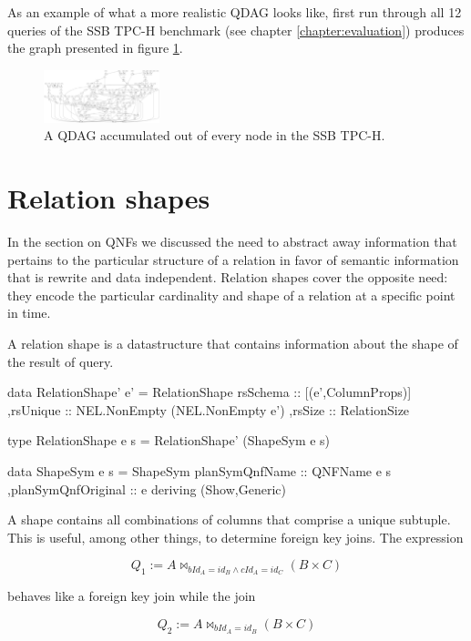 As an example of what a more realistic QDAG looks like, first run
through all 12 queries of the SSB TPC-H benchmark (see chapter
\ref{chapter:evaluation}) produces the graph presented in figure
\ref{fig:ssb_graph}.

\begin{figure}[H]
  \centering
  \includegraphics[width=0.3\textwidth]{./imgs/ssb_graph.pdf}
  \caption{\label{fig:ssb_graph}A QDAG accumulated out of every node
    in the SSB TPC-H.}
\end{figure}



\section{Relation shapes}

In the section on QNFs we discussed the need to abstract away
information that pertains to the particular structure of a relation in
favor of semantic information that is rewrite and data
independent. Relation shapes cover the opposite need: they encode the
particular cardinality and shape of a relation at a specific point in
time.

A relation shape is a datastructure that contains information about
the shape of the result of query.

\begin{haskellcode}
  data RelationShape' e' =
    RelationShape
    { rsSchema :: [(e',ColumnProps)]
      ,rsUnique :: NEL.NonEmpty (NEL.NonEmpty e')
      ,rsSize :: RelationSize
    }

  type RelationShape e s = RelationShape' (ShapeSym e s)

  data ShapeSym e s =
    ShapeSym { planSymQnfName :: QNFName e s
      ,planSymQnfOriginal :: e
    }
    deriving (Show,Generic)
\end{haskellcode}

A shape contains all combinations of columns that comprise a unique
subtuple.  This is useful, among other things, to determine foreign
key joins. The expression

\[Q_1 := A \Join_{bId_A = id_B \land cId_A = id_C} (B \times C)\]

behaves like a foreign key join while the join

\[Q_2 := A \Join_{bId_A = id_B} (B \times C)\]

